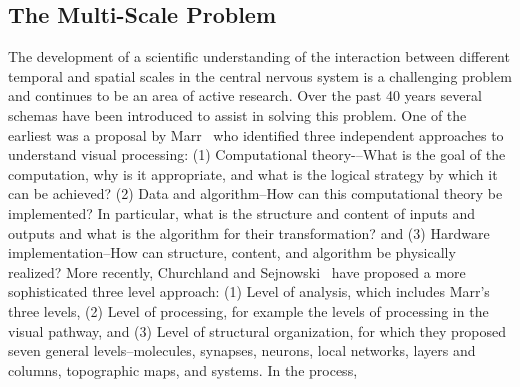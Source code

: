 \documentclass{article}
\begin{document}
\subsection{The Multi-Scale Problem}
The development of a scientific understanding of the interaction between different temporal and spatial scales in the central nervous system is a challenging problem and continues to be an area of active research.  Over the past 40 years several schemas have been introduced to assist in solving this problem.  One of the earliest was a proposal by Marr~\cite{Marr:19821kx} who identified three independent approaches to understand visual processing: (1) Computational theory-–What is the goal of the computation, why is it appropriate, and what is the logical strategy by which it can be achieved? (2) Data and algorithm–How can this computational theory be implemented? In particular, what is the structure and content of inputs and outputs and what is the algorithm for their transformation? and (3) Hardware implementation–How can structure, content, and algorithm be physically realized?  More recently, Churchland and Sejnowski~\cite{Churchland:1992uq} have proposed a more sophisticated three level approach: (1) Level of analysis, which includes Marr’s three levels, (2) Level of processing, for example the levels of processing in the visual pathway, and (3) Level of structural organization, for which they proposed seven general levels–molecules, synapses, neurons, local networks, layers and columns, topographic maps, and systems. In the process, 

\end{document}
